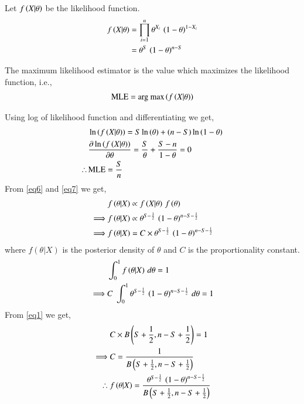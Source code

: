 \documentclass[journal,12pt,twocolumn]{IEEEtran}
\begin{document}
Let $f\left(X|\theta\right)$ be the likelihood function.
\begin{align}
    f\left(X|\theta\right) &= \prod_{i=1}^n\theta^{X_i}\,\left(1-\theta\right)^{1-X_i}\nonumber\\
    &=\theta^S\,\left(1-\theta\right)^{n-S}\label{eq7}
\end{align}
\begin{definition}
The maximum likelihood estimator is the value which maximizes the likelihood function, i.e.,
\begin{align}
    \text{MLE} = \text{arg max}\left(f\left(X|\theta\right)\right)
\end{align}
\end{definition}
Using log of likelihood function and differentiating we get,
\begin{align}
    &\ln\left({f\left(X|\theta\right)}\right) = S\ln\left({\theta}\right) + \left(n-S\right)\ln\left({1-\theta}\right)\\
    &\frac{\partial \ln\left({f\left(X|\theta\right)}\right)}{\partial \theta} = \frac{S}{\theta} + \frac{S-n}{1-\theta} = 0 \nonumber\\
     \therefore\, &\text{MLE} = \frac{S}{n}
\end{align}
From \eqref{eq6} and \eqref{eq7} we get,
\begin{align}
    &f\left(\theta|X\right) \propto f\left(X|\theta\right)\, f\left(\theta\right)\nonumber\\
    \implies &f\left(\theta|X\right) \propto \theta^{S-\frac{1}{2}}\,\left(1-\theta\right)^{n-S-\frac{1}{2}}\nonumber\\
    \implies &f\left(\theta|X\right) = C\times \theta^{S-\frac{1}{2}}\,\left(1-\theta\right)^{n-S-\frac{1}{2}}
\end{align}
where $f(\theta|X)$ is the posterior density of $\theta$ and $C$ is the proportionality constant.
\begin{align}
    &\int_0^1 f\left(\theta|X\right)\,d\theta = 1\nonumber\\
    \implies &C\;\int_0^1 \theta^{S-\frac{1}{2}}\,\left(1-\theta\right)^{n-S-\frac{1}{2}}\,d\theta = 1
\end{align}
From \eqref{eq1} we get,
\begin{align}
    &C\times B\left(S+\frac{1}{2},n-S+\frac{1}{2}\right) = 1\nonumber\\
    \implies &C = \frac{1}{B\left(S+\frac{1}{2},n-S+\frac{1}{2}\right)}\\
    \therefore\; &f\left(\theta|X\right) = \frac{\theta^{S-\frac{1}{2}}\,\left(1-\theta\right)^{n-S-\frac{1}{2}}}{B\left(S+\frac{1}{2},n-S+\frac{1}{2}\right)}
\end{align}
\end{document}
